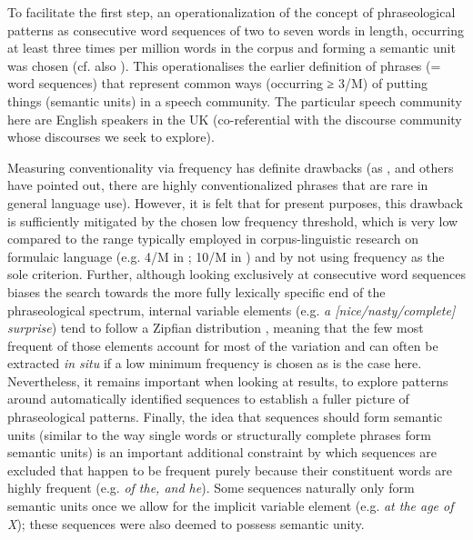 \documentclass[output=paper]{langscibook}
\begin{document}
To facilitate the first step, an operationalization of the concept of phraseological patterns as consecutive word sequences of two to seven words in length, occurring at least three times per million words in the corpus and forming a semantic unit was chosen (cf. also \citealt[ch.~3]{Buerki2020}). This operationalises the earlier definition of phrases (= word sequences) that represent common ways (occurring ≥ 3/M) of putting things (semantic units) in a speech community. The particular speech community here are English speakers in the UK (co-referential with the discourse community whose discourses we seek to explore). 

Measuring conventionality via frequency has definite drawbacks (as \citealt[31]{Wray2002}, and others have pointed out, there are highly conventionalized phrases that are rare in general language use). However, it is felt that for present purposes, this drawback is sufficiently mitigated by the chosen low frequency threshold, which is very low compared to the range typically employed in corpus-linguistic research on formulaic language (e.g. 4/M in \citealt[12]{McCarthyCarter2002}; 10/M in \citealt{BiberEtAl1999}) and by not using frequency as the sole criterion. Further, although looking exclusively at consecutive word sequences biases the search towards the more fully lexically specific end of the phraseological spectrum, internal variable elements (e.g. \textit{a [nice\slash nasty\slash complete] surprise}) tend to follow a Zipfian distribution \citep[35]{Ellis2012}, meaning that the few most frequent of those elements account for most of the variation and can often be extracted \textit{in situ} if a low minimum frequency is chosen as is the case here. Nevertheless, it remains important when looking at results, to explore patterns around automatically identified sequences to establish a fuller picture of phraseological patterns. Finally, the idea that sequences should form semantic units (similar to the way single words or structurally complete phrases form semantic units) is an important additional constraint by which sequences are excluded that happen to be frequent purely because their constituent words are highly frequent (e.g. \textit{of the, and he}). Some sequences naturally only form semantic units once we allow for the implicit variable element (e.g. \textit{at the age of X}); these sequences were also deemed to possess semantic unity.
\end{document}
